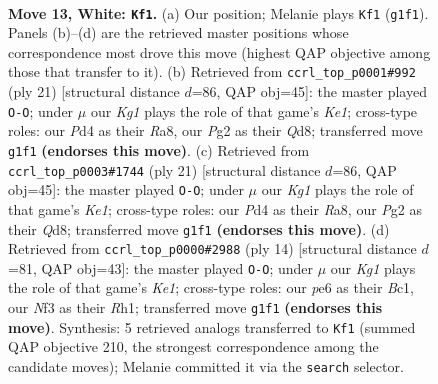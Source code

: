 \documentclass[11pt]{article}
\begin{document}
\clearpage

\begin{figure}[p]\centering
\begin{subfigure}{0.46\textwidth}\centering
\resizebox{\linewidth}{!}{%
\newchessgame
\chessboard[
  setfen={rnbq1rk1/5p2/1p2pnp1/p2p3p/3P4/2NB1NP1/PPP2PP1/2RQR1K1 w - - 0 13},
  showmover=false,
  pgfstyle=straightmove, color=movearrow, markmove={g1-f1}
]}
\caption{}
\end{subfigure}\hfill
\begin{subfigure}{0.46\textwidth}\centering
\resizebox{\linewidth}{!}{%
\newchessgame
\chessboard[
  setfen={r2qk2r/pb1p1ppp/1pnbpn2/8/2P1P3/PNN1BP2/1PQ3PP/R3KB1R b KQkq - 2 11},
  showmover=false,
  pgfstyle=straightmove, color=movearrow, markmove={e8-g8}
]}
\caption{}
\end{subfigure}
\\[4pt]
\begin{subfigure}{0.46\textwidth}\centering
\resizebox{\linewidth}{!}{%
\newchessgame
\chessboard[
  setfen={r2qk2r/pb1p1ppp/1pnbpn2/8/2P1P3/PNN1BP2/1PQ3PP/R3KB1R b KQkq - 2 11},
  showmover=false,
  pgfstyle=straightmove, color=movearrow, markmove={e8-g8}
]}
\caption{}
\end{subfigure}\hfill
\begin{subfigure}{0.46\textwidth}\centering
\resizebox{\linewidth}{!}{%
\newchessgame
\chessboard[
  setfen={rn1qkb1r/pbp2p1p/1p3np1/3p4/3P4/2NBPN2/PP3PPP/R1BQK2R w KQkq - 0 8},
  showmover=false,
  pgfstyle=straightmove, color=movearrow, markmove={e1-g1}
]}
\caption{}
\end{subfigure}
\caption{\textbf{Move 13, White: \texttt{Kf1}.} (a) Our position; Melanie plays \texttt{Kf1} (\texttt{g1f1}). Panels (b)--(d) are the retrieved master positions whose correspondence most drove this move (highest QAP objective among those that transfer to it). (b) Retrieved from \texttt{ccrl\_top\_p0001\#992} (ply 21) [structural distance $d$=86, QAP obj=45]: the master played \texttt{O-O}; under $\mu$ our \emph{Kg1} plays the role of that game's \emph{Ke1}; cross-type roles: our \emph{P}d4 as their \emph{R}a8, our \emph{P}g2 as their \emph{Q}d8; transferred move \texttt{g1f1} \textbf{(endorses this move)}. (c) Retrieved from \texttt{ccrl\_top\_p0003\#1744} (ply 21) [structural distance $d$=86, QAP obj=45]: the master played \texttt{O-O}; under $\mu$ our \emph{Kg1} plays the role of that game's \emph{Ke1}; cross-type roles: our \emph{P}d4 as their \emph{R}a8, our \emph{P}g2 as their \emph{Q}d8; transferred move \texttt{g1f1} \textbf{(endorses this move)}. (d) Retrieved from \texttt{ccrl\_top\_p0000\#2988} (ply 14) [structural distance $d$=81, QAP obj=43]: the master played \texttt{O-O}; under $\mu$ our \emph{Kg1} plays the role of that game's \emph{Ke1}; cross-type roles: our \emph{p}e6 as their \emph{B}c1, our \emph{N}f3 as their \emph{R}h1; transferred move \texttt{g1f1} \textbf{(endorses this move)}. Synthesis: 5 retrieved analogs transferred to \texttt{Kf1} (summed QAP objective 210, the strongest correspondence among the candidate moves); Melanie committed it via the \texttt{search} selector.}
\label{fig:thought-m24}
\end{figure}
\end{document}
